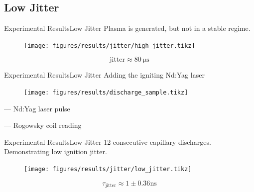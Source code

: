 \documentclass[dvipsnames]{beamer}
\begin{document}
\subsection{Low Jitter}
\begin{frame}{Experimental Results}{Low Jitter}
Plasma is generated, but not in a stable regime.
\begin{figure}
 \texttt{[image: figures/results/jitter/high\_jitter.tikz]}
\end{figure}
$$\text{jitter}\approx \SI{80}{\us}$$
\end{frame}
\begin{frame}{Experimental Results}{Low Jitter}
Adding the igniting Nd:Yag laser
\begin{figure}
 \texttt{[image: figures/results/discharge\_sample.tikz]}
\end{figure}
 --- Nd:Yag laser pulse

 --- Rogowsky coil reading
\end{frame}
\begin{frame}{Experimental Results}{Low Jitter}
\small{12 consecutive capillary discharges. Demonstrating low ignition jitter.}
\begin{figure}
\texttt{[image: figures/results/jitter/low\_jitter.tikz]}
\end{figure}
$$\tau_\text{jitter}\approx 1\pm 0.36 \si{\ns}$$
\end{frame}
\end{document}
